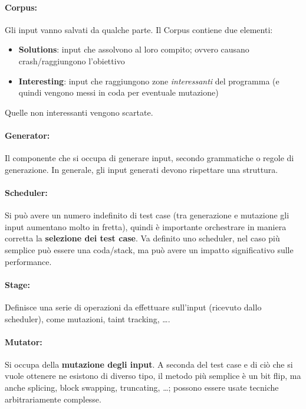 \newpage

\paragraph{Corpus:} Gli input vanno salvati da qualche parte. Il Corpus contiene due elementi:
\begin{itemize}
	\item \textbf{Solutions}: input che assolvono al loro compito; ovvero causano crash/raggiungono l'obiettivo
	\item \textbf{Interesting}: input che raggiungono zone \textit{interessanti} del programma (e quindi vengono messi in coda per eventuale mutazione)
\end{itemize}
Quelle non interessanti vengono scartate.\\

\paragraph{Generator:} Il componente che si occupa di generare input, secondo grammatiche o regole di generazione. In generale, gli input generati devono rispettare una struttura.\\

\paragraph{Scheduler:} Si può avere un numero indefinito di test case (tra generazione e mutazione gli input aumentano molto in fretta), quindi è importante orchestrare in maniera corretta la \textbf{selezione dei test case}. Va definito uno scheduler, nel caso più semplice può essere una coda/stack, ma può avere un impatto significativo sulle performance.\\

\paragraph{Stage:} Definisce una serie di operazioni da effettuare sull'input (ricevuto dallo scheduler), come mutazioni, taint tracking, \dots.\\

\paragraph{Mutator:} Si occupa della \textbf{mutazione degli input}. A seconda del test case e di ciò che si vuole ottenere ne esistono di diverso tipo, il metodo più semplice è un bit flip, ma anche splicing, block swapping, truncating, \dots; possono essere usate tecniche arbitrariamente complesse.\\

